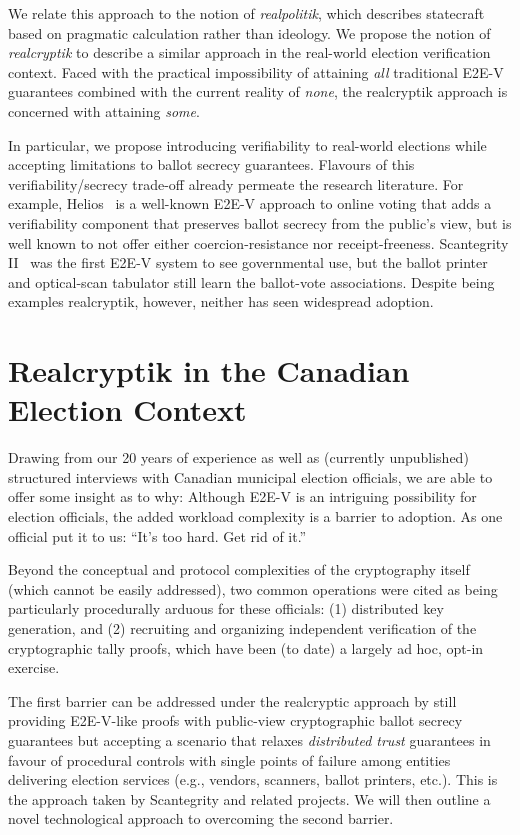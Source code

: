 \documentclass[runningheads]{llncs}
\begin{document}
We relate this approach to the notion of \emph{realpolitik}, which describes statecraft based on pragmatic calculation rather than ideology. We propose the notion of \textit{realcryptik} to describe a similar approach in the real-world election verification context. Faced with the practical impossibility of attaining {\em all} traditional E2E-V guarantees combined with the current reality of {\em none}, the realcryptik approach is concerned with attaining {\em some}.

In particular, we propose introducing verifiability to real-world elections while accepting limitations to ballot secrecy guarantees. Flavours of this verifiability/secrecy trade-off already permeate the research literature. For example, Helios~\cite{Adi08} is a well-known E2E-V approach to online voting that adds a verifiability component that preserves ballot secrecy from the public's view, but is well known to not offer either coercion-resistance nor receipt-freeness. Scantegrity II~\cite{CCC+08} was the first E2E-V system to see governmental use, but the ballot printer and optical-scan tabulator still learn the ballot-vote associations. Despite being examples realcryptik, however, neither has seen widespread adoption. 

\section*{Realcryptik in the Canadian Election Context}

Drawing from our 20 years of experience as well as (currently unpublished) structured interviews with Canadian municipal election officials, we are able to offer some insight as to why: Although E2E-V is an intriguing possibility for election officials, the added workload complexity is a barrier to adoption. As one official put it to us: ``It's too hard. Get rid of it.''

Beyond the conceptual and protocol complexities of the cryptography itself (which cannot be easily addressed), two common operations were cited as being particularly procedurally arduous for these officials: (1) distributed key generation, and (2) recruiting and organizing independent verification of the cryptographic tally proofs, which have been (to date) a largely ad hoc, opt-in exercise.

The first barrier can be addressed under the realcryptic approach by still providing E2E-V-like proofs with public-view cryptographic ballot secrecy guarantees but accepting a scenario that relaxes {\em distributed trust} guarantees in favour of procedural controls with single points of failure among entities delivering election services (e.g., vendors, scanners, ballot printers, etc.). This is the approach taken by Scantegrity and related projects. We will then outline a novel technological approach to overcoming the second barrier.
\end{document}

